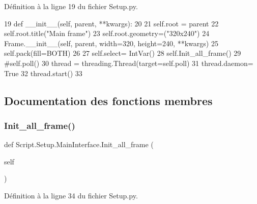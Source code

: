Définition à la ligne 19 du fichier Setup.\+py.


\begin{DoxyCode}
19     \textcolor{keyword}{def }\_\_init\_\_(self, parent, **kwargs):
20 
21         self.root = parent
22         self.root.title(\textcolor{stringliteral}{"Main frame"})
23         self.root.geometry=(\textcolor{stringliteral}{"320x240"})
24         Frame.\_\_init\_\_(self, parent, width=320, height=240, **kwargs)
25         self.pack(fill=BOTH)
26 
27         self.select= IntVar()
28         self.Init\_all\_frame()
29         \textcolor{comment}{#self.poll()
}
30         thread = threading.Thread(target=self.poll)
31         thread.daemon= \textcolor{keyword}{True}
32         thread.start()
33     
\end{DoxyCode}


\subsection{Documentation des fonctions membres}
\mbox{\label{classScript_1_1Setup_1_1MainInterface_aaa122e78c353c8b0014b07ff944d7818}} 
\subsubsection{\texorpdfstring{Init\+\_\+all\+\_\+frame()}{Init\_all\_frame()}}
{\footnotesize\ttfamily def Script.\+Setup.\+Main\+Interface.\+Init\+\_\+all\+\_\+frame (\begin{DoxyParamCaption}\item[{}]{self }\end{DoxyParamCaption})}



Définition à la ligne 34 du fichier Setup.\+py.


